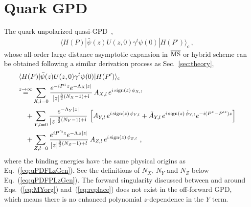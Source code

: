 \documentclass[a4paper,11pt]{article}
\begin{document}
\section{Quark GPD}\label{sec:GPD}
The quark unpolarized quasi-GPD~\cite{Ji:2015qla,Bhattacharya:2023jsc},
\begin{align}
\langle H(P) | \bar{\psi}(z) U(z,0) \gamma^t  \psi(0) | H(P') \rangle_c \ ,
\end{align}
whose all-order large distance asymptotic expansion in $\overline{\rm MS}$ or hybrid scheme can be obtained following a similar derivation process as Sec.~\ref{sec:theory},
\begin{align}\label{eq:qGPDLzGen}
&\langle H(P) | \bar{\psi}(z) U(z,0) \gamma^t  \psi(0) | H(P') \rangle_c   \nonumber\\
&{\overset{z\rightarrow \infty}{=}}   
 \sum_{X,l=0} \frac{e^{-i P^z z} e^{-\Lambda_X |z| }}{|z|^{\frac{3}{2}(N_X-1)+l}} \, A_{X,l} \, e^{i \, {\rm sign}(z) \, \phi_{X,l}} \nonumber\\
&\quad + \sum_{Y,l=0} \frac{e^{-\Lambda_Y |z|}}{|z|^{\frac{3}{2}(N_Y-1)+l}} \, \left[ A_{Y,l} \, e^{i \, {\rm sign}(z) \, \phi_{Y,l}} +  \tilde{A}_{Y,l} \, e^{i \, {\rm sign}(z) \, \tilde{\phi}_{Y,l}} e^{-i (P^z-P'^z) z}\right]\nonumber\\
&\quad + \sum_{Z,l=0} \frac{e^{i P'^z z} e^{-\Lambda_Z |z|}}{|z|^{\frac{3}{2}(N_Z-1)+l}} \, A_{Z,l} \, e^{i \, {\rm sign}(z) \, \phi_{Z,l}} \ ,
\end{align}
where the binding energies have the same physical origins as Eq.~(\ref{eq:qPDFLzGen}). See the definitions of $N_X$, $N_Y$ and $N_Z$ below Eq.~(\ref{eq:qPDFPLzGen}). The forward singularity discussed between and around Eqs.~(\ref{eq:MYorg}) and~(\ref{eq:replace}) does not exist in the off-forward GPD, which means there is no enhanced polynomial $z$-dependence in the $Y$ term. 
\end{document}
